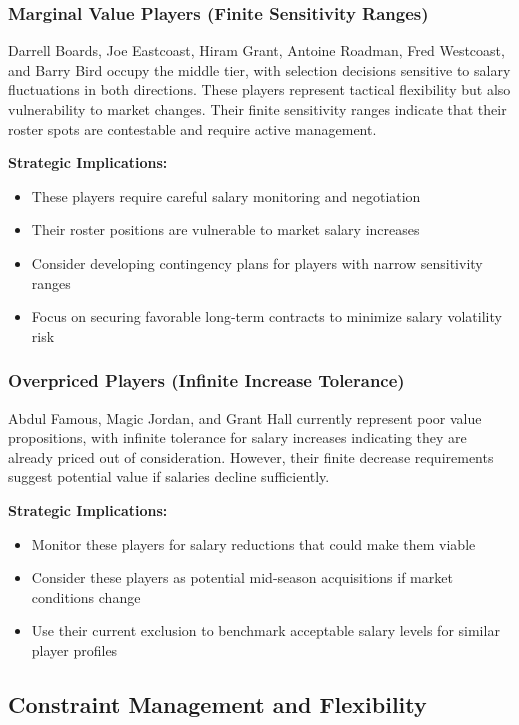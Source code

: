 \documentclass[a4paper,11pt]{article}
\begin{document}
\subsubsection{Marginal Value Players (Finite Sensitivity Ranges)}
Darrell Boards, Joe Eastcoast, Hiram Grant, Antoine Roadman, Fred Westcoast, and Barry Bird occupy the middle tier, with selection decisions sensitive to salary fluctuations in both directions. These players represent tactical flexibility but also vulnerability to market changes. Their finite sensitivity ranges indicate that their roster spots are contestable and require active management.

\textbf{Strategic Implications:}
\begin{itemize}
    \item These players require careful salary monitoring and negotiation
    \item Their roster positions are vulnerable to market salary increases
    \item Consider developing contingency plans for players with narrow sensitivity ranges
    \item Focus on securing favorable long-term contracts to minimize salary volatility risk
\end{itemize}

\subsubsection{Overpriced Players (Infinite Increase Tolerance)}
Abdul Famous, Magic Jordan, and Grant Hall currently represent poor value propositions, with infinite tolerance for salary increases indicating they are already priced out of consideration. However, their finite decrease requirements suggest potential value if salaries decline sufficiently.

\textbf{Strategic Implications:}
\begin{itemize}
    \item Monitor these players for salary reductions that could make them viable
    \item Consider these players as potential mid-season acquisitions if market conditions change
    \item Use their current exclusion to benchmark acceptable salary levels for similar player profiles
\end{itemize}

\subsection{Constraint Management and Flexibility}
\end{document}

